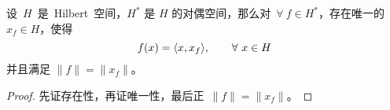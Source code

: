 \begin{theorem}
	设~$H$~是~Hilbert~空间，$H^{\ast}$ 是 $H$ 的对偶空间，那么对~$\forall~f\in H^{\ast}$，存在唯一的~$x_f\in H$，使得
	\begin{equation}
	f(x) = \langle x,x_f \rangle, \qquad \forall~x \in H
	\end{equation}
	并且满足 $\|f\|=\|x_f\|$。
\end{theorem}

\begin{proof}
	先证存在性，再证唯一性，最后正~$\|f\|=\|x_f\|$。
\end{proof}

